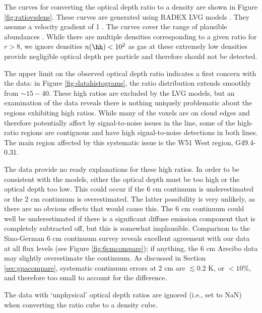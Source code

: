 The curves for converting the optical depth ratio to a density are shown in
Figure \ref{fig:ratiovsdens}.  These curves are generated using RADEX LVG models
\citep[python wrapper \url{https://github.com/keflavich/pyradex/}; original
code][]{van-Der-Tak2007a}.  They assume a velocity gradient of 1 \kms \perpc.
The curves cover the range of plausible \formaldehyde abundances
\citep{Mangum1993a}.  While there are multiple densities corresponding to a
given ratio for $r>8$, we ignore densities $n(\hh)<10^2$ \percc as gas at these
extremely low densities provide negligible optical depth per particle and
therefore should not be detected.

The upper limit on the observed optical depth ratio indicates a first concern
with the data: in Figure \ref{fig:datahistograms}, the ratio distribution
extends smoothly from $\sim15-40$.  These high ratios are excluded by the LVG
models, but an examination of the data reveals there is nothing uniquely
problematic about the regions exhibiting high ratios.  While many of the voxels
are on cloud edges and therefore potentially affect by signal-to-noise issues
in the \twotwo line, some of the high-ratio regions are contiguous and have
high signal-to-noise detections in both lines.  The main region affected by
this systematic issue is the W51 West region, G49.4-0.31.

The data provide no ready explanations for these high ratios.  In order to
be consistent with the models, either the \oneone optical depth must be
too high or the \twotwo optical depth too low.  This could occur if the
6 cm continuum is underestimated or the 2 cm continuum is overestimated.
The latter possibility is very unlikely, as there are no obvious effects that
would cause this.  The 6 cm continuum could well be underestimated if there
is a significant diffuse emission component that is completely subtracted off,
but this is somewhat implausible.  Comparison to the Sino-German 6 cm continuum
survey \citep{Sun2007a,Sun2011b} reveals excellent agreement with our data at
all flux levels (see Figure \ref{fig:6cmcompare}); if anything, the 6 cm
Arecibo data may slightly overestimate the continuum.
As discussed in Section \ref{sec:gpacompare}, systematic continuum errors at 2
cm are $\lesssim 0.2$ K, or $<10\%$, and therefore too small to account for the
difference.

The data with `unphysical' optical depth ratios are ignored (i.e., set to NaN)
when converting the ratio cube to a density cube.

